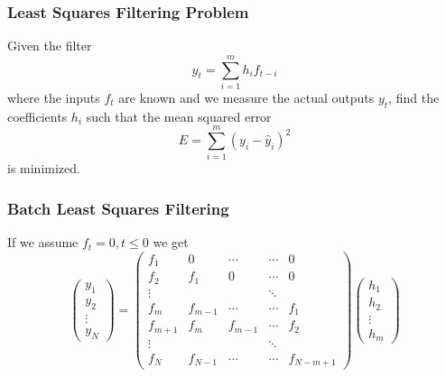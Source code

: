 \documentclass{beamer}
\begin{document}
\begin{frame}\frametitle{Least Squares Filtering Problem}
	\begin{definition}
		Given the filter
		\[ \hat{y}_t = \sum_{i=1}^m h_i f_{t-i} \]
		where the inputs $f_t$ are known and we measure the actual outputs $y_t$, 
		find the coefficients $h_i$ such that the mean squared error 
		\[
		E = \sum_{i=1}^m \left( y_i-\hat{y}_i \right)^2
		\]
		is minimized.
	\end{definition}
\end{frame}

\begin{frame}\frametitle{Batch Least Squares Filtering}
	If we assume $f_t = 0, t \leq 0$ we get
	{\footnotesize
	\[
		\begin{pmatrix}
	 		y_1\\
 	   		y_2\\
 	   		\vdots\\
 	   		y_N
 	   	\end{pmatrix}
 	   	=
 	   	\begin{pmatrix}
   	  		f_1 & 0 & \cdots & \cdots & 0\\
  	  		f_2 & f_1 & 0 & \cdots & 0\\
    		\vdots & & & \ddots\\
    		f_m & f_{m-1} & \cdots & \cdots & f_1 \\
    		f_{m+1} & f_m & f_{m-1} & \cdots & f_2 \\
    		\vdots & & & \ddots \\
    		f_N & f_{N-1} & \cdots & \cdots & f_{N-m+1}
    	\end{pmatrix}
    	\begin{pmatrix}
    		h_1 \\
    		h_2 \\
    		\vdots\\
    		h_m
    	\end{pmatrix}
	\]
	}
\end{frame}
\end{document}
